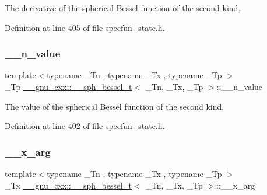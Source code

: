 The derivative of the spherical Bessel function of the second kind. 



Definition at line 405 of file specfun\+\_\+state.\+h.

\mbox{\label{struct____gnu__cxx_1_1____sph__bessel__t_ad846c3cb00bfabcbddc3e2f6512e3d7f}} 
\subsubsection{\texorpdfstring{\+\_\+\+\_\+n\+\_\+value}{\_\_n\_value}}
{\footnotesize\ttfamily template$<$typename \+\_\+\+Tn , typename \+\_\+\+Tx , typename \+\_\+\+Tp $>$ \\
\+\_\+\+Tp \hyperlink{struct____gnu__cxx_1_1____sph__bessel__t}{\+\_\+\+\_\+gnu\+\_\+cxx\+::\+\_\+\+\_\+sph\+\_\+bessel\+\_\+t}$<$ \+\_\+\+Tn, \+\_\+\+Tx, \+\_\+\+Tp $>$\+::\+\_\+\+\_\+n\+\_\+value}



The value of the spherical Bessel function of the second kind. 



Definition at line 402 of file specfun\+\_\+state.\+h.

\mbox{\label{struct____gnu__cxx_1_1____sph__bessel__t_afa9cf4b1888081bd21716c58ed19719b}} 
\subsubsection{\texorpdfstring{\+\_\+\+\_\+x\+\_\+arg}{\_\_x\_arg}}
{\footnotesize\ttfamily template$<$typename \+\_\+\+Tn , typename \+\_\+\+Tx , typename \+\_\+\+Tp $>$ \\
\+\_\+\+Tx \hyperlink{struct____gnu__cxx_1_1____sph__bessel__t}{\+\_\+\+\_\+gnu\+\_\+cxx\+::\+\_\+\+\_\+sph\+\_\+bessel\+\_\+t}$<$ \+\_\+\+Tn, \+\_\+\+Tx, \+\_\+\+Tp $>$\+::\+\_\+\+\_\+x\+\_\+arg}



